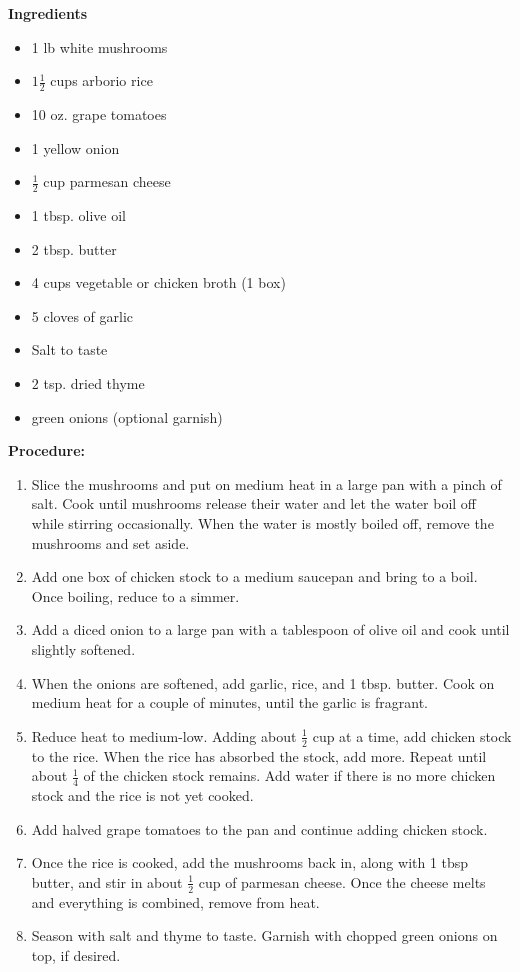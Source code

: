 \begin{multicols}{2}
\textbf{Ingredients}
\begin{itemize}
\item 1 lb white mushrooms
\item $1\frac{1}{2}$ cups arborio rice
\item 10 oz. grape tomatoes
\item 1 yellow onion
\item $\frac{1}{2}$ cup parmesan cheese
\item 1 tbsp. olive oil
\item 2 tbsp. butter
\item 4 cups vegetable or chicken broth (1 box)
\item 5 cloves of garlic
\item Salt to taste
\item $2$ tsp. dried thyme
\item green onions (optional garnish)
\end{itemize}


\columnbreak
\textbf{Procedure:}
\medskip


\begin{enumerate}

\item Slice the mushrooms and put on medium heat in a large pan with a pinch of salt. Cook until mushrooms release their water and let the water boil off while stirring occasionally. When the water is mostly boiled off, remove the mushrooms and set aside. 
\item Add one box of chicken stock to a medium saucepan and bring to a boil. Once boiling, reduce to a simmer. 
\item Add a diced onion to a large pan with a tablespoon of olive oil and cook until slightly softened. 
\item When the onions are softened, add garlic, rice, and 1 tbsp. butter. Cook on medium heat for a couple of minutes, until the garlic is fragrant. 
\item Reduce heat to medium-low. Adding about $\frac{1}{2}$ cup at a time, add chicken stock to the rice. When the rice has absorbed the stock, add more. Repeat until about $\frac{1}{4}$ of the chicken stock remains. Add water if there is no more chicken stock and the rice is not yet cooked. 
\item Add halved grape tomatoes to the pan and continue adding chicken stock.
\item Once the rice is cooked, add the mushrooms back in, along with 1 tbsp butter, and stir in about $\frac{1}{2}$ cup of parmesan cheese. Once the cheese melts and everything is combined, remove from heat. 
\item Season with salt and thyme to taste. Garnish with chopped green onions on top, if desired. 


 
\end{enumerate}
\end{multicols}
